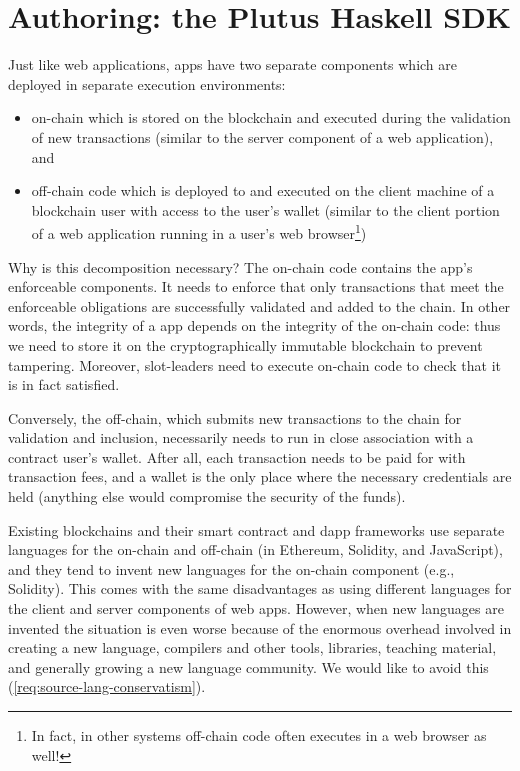 \section{Authoring: the Plutus Haskell SDK}
\label{sec:sdk}

Just like web applications, \glspl{app} have two separate components which are deployed in separate execution environments:
\begin{itemize}
\item \gls{on-chain} which is stored on the blockchain and executed during the validation of new transactions (similar to the server component of a web application), and
\item \gls{off-chain} code which is deployed to and executed on the client machine of a blockchain user with access to the user’s wallet (similar to the client portion of a web application running in a user’s web browser\footnote{
In fact, in other systems off-chain code often executes in a web browser as well!
})
\end{itemize}

Why is this decomposition necessary? The on-chain code contains the \gls{app}'s enforceable components.
It needs to enforce that only transactions that meet the enforceable obligations are successfully validated and added to the chain.
In other words, the integrity of a \gls{app} depends on the integrity of the on-chain code: thus we need to store it on the cryptographically immutable blockchain to prevent tampering.
Moreover, \glspl{slot-leader} need to execute on-chain code to check that it is in fact satisfied.

Conversely, the \gls{off-chain}, which submits new transactions to the chain for validation and inclusion, necessarily needs to run in close association with a contract user’s wallet.
After all, each transaction needs to be paid for with transaction fees, and a wallet is the only place where the necessary credentials are held (anything else would compromise the security of the funds).

Existing blockchains and their smart contract and dapp frameworks use separate languages for the \gls{on-chain} and \gls{off-chain} (in Ethereum, Solidity, and JavaScript), and they tend to invent new languages for the on-chain component (e.g., Solidity).
This comes with the same disadvantages as using different languages for the client and server components of web apps.
However, when new languages are invented the situation is even worse because of the enormous overhead involved in creating a new language, compilers and other tools, libraries, teaching material, and generally growing a new language community. We would like to avoid this (\cref{req:source-lang-conservatism}).

